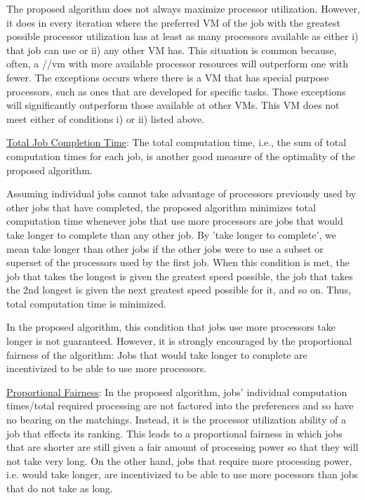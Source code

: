 \documentclass[conference]{IEEEtran}
\begin{document}
The proposed algorithm does not always maximize processor 
utilization. However, it does in every iteration 
where the preferred VM of the job with
the greatest possible processor utilization
has at least as many processors 
available as either
    i) that job can use or
    ii) any other VM has.
This situation is common because, often, a //vm with more 
available processor resources will outperform
one with fewer. The exceptions occurs where there is 
a VM that has special purpose processors, such as ones
that are developed for specific tasks.  Those exceptions
will significantly outperform those available at other 
VMs.  This VM does not meet either 
of conditions i) or ii) listed above.

\underline{Total Job Completion Time}:
The total computation time, i.e., the 
sum of total computation times for each job,
is another good measure of the optimality 
of the proposed algorithm.

Assuming individual jobs cannot take advantage
of processors previously used by other jobs
that have completed, 
the proposed algorithm minimizes total 
computation time whenever 
jobs that use more processors are jobs that would take 
longer to complete than any other job. 
By 'take longer to complete', we mean take longer than
other jobs if the other jobs were to use a subset or 
superset of the processors used by the first job.
When this condition is met, the job that takes the
longest is given the greatest speed possible, the job that 
takes the 2nd longest is given the next greatest speed 
possible for it, and so on. 
Thus, total computation time is minimized.

In the proposed algorithm, this condition that jobs use
more processors take longer is not guaranteed.
However, it is strongly encouraged by the 
proportional fairness of the algorithm:
Jobs that would take longer to complete are incentivized
to be able to use more processors.

\underline{Proportional Fairness}:
In the proposed algorithm, jobs' individual computation
times/total required processing are not factored into
the preferences and so have no bearing on the matchings.
Instead, it is the processor utilization ability of 
a job that effects its ranking. This leads to a proportional
fairness in which jobs that are shorter are still given 
a fair amount of processing power so that they will not take
very long. 
On the other hand, jobs that
require more processing power, i.e. would take longer,
are incentivized to be able to use more pocessors than 
jobs that do not take as long.
\end{document}
